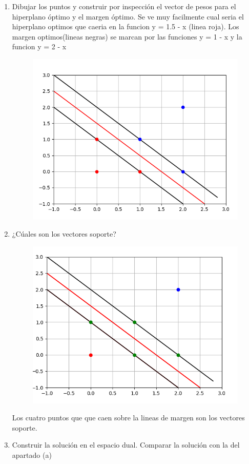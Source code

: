 \documentclass[titlepage]{article}
\begin{document}
\begin{enumerate}
	\item Dibujar los puntos y construir por inspección el vector de pesos para el hiperplano óptimo y el margen óptimo.
	Se ve muy facilmente cual seria el hiperplano optimos que caeria en la funcion y = 1.5 - x (linea roja). Los margen optimos(lineas negras) se marcan por las funciones y = 1 - x y la funcion y = 2 - x
		\begin{figure}[H]
			\centering
			\includegraphics[width=0.7\linewidth]{screenshot003}
			
		\end{figure}

	\newpage
	\item ¿Cúales son los vectores soporte?
	\begin{figure}[H]
		\centering
		\includegraphics[width=0.7\linewidth]{screenshot002}

	\end{figure}
	Los cuatro puntos que que caen sobre la lineas de margen son los vectores soporte.

	\item Construir la solución en el espacio dual. Comparar la solución con la del apartado (a)

\end{enumerate}
\end{document}
